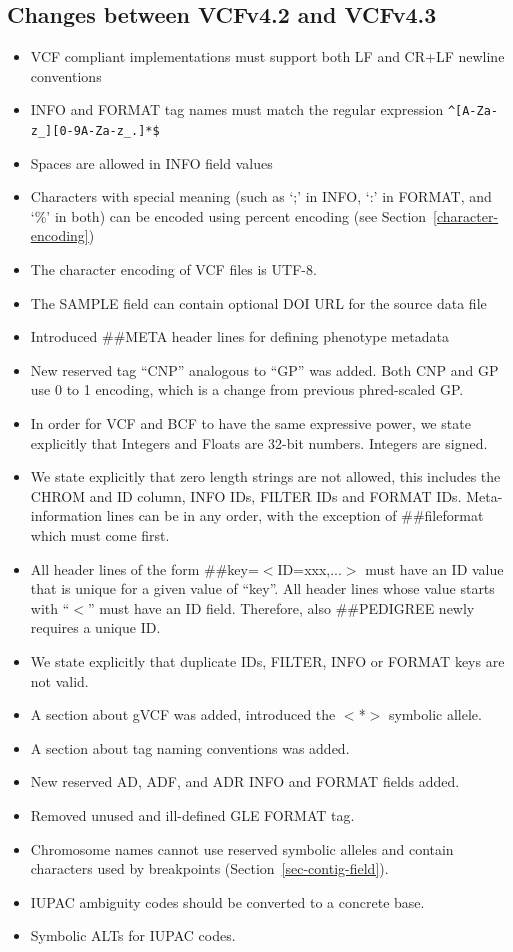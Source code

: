 \documentclass[8pt]{article}
\begin{document}
\subsection{Changes between VCFv4.2 and VCFv4.3}

\begin{itemize}
\item VCF compliant implementations must support both LF and CR+LF newline conventions
\item INFO and FORMAT tag names must match the regular expression \texttt{\^{}[A-Za-z\_][0-9A-Za-z\_.]*\$}
\item Spaces are allowed in INFO field values
\item Characters with special meaning (such as `;' in INFO, `:' in FORMAT, and `\%' in both) can be encoded using percent encoding (see Section~\ref{character-encoding})
\item The character encoding of VCF files is UTF-8.
\item The SAMPLE field can contain optional DOI URL for the source data file
\item Introduced \#\#META header lines for defining phenotype metadata
\item New reserved tag ``CNP'' analogous to ``GP'' was added. Both CNP and GP use 0 to 1 encoding, which is a change from previous phred-scaled GP.
\item In order for VCF and BCF to have the same expressive power, we state explicitly that Integers and Floats are 32-bit numbers.
Integers are signed.
\item We state explicitly that zero length strings are not allowed, this includes the CHROM and ID column, INFO IDs, FILTER IDs and FORMAT IDs.
Meta-information lines can be in any order, with the exception of \#\#fileformat which must come first.
\item All header  lines of the form \#\#key=$<$ID=xxx,...$>$ must have an ID value that is unique for a given value of ``key''.
All header lines whose value starts with ``$<$'' must have an ID field.
Therefore, also \#\#PEDIGREE newly requires a unique ID.
\item We state explicitly that duplicate IDs, FILTER, INFO or FORMAT keys are not valid.
\item A section about gVCF was added, introduced the $<$*$>$ symbolic allele.
\item A section about tag naming conventions was added.
\item New reserved AD, ADF, and ADR INFO and FORMAT fields added.
\item Removed unused and ill-defined GLE FORMAT tag.
\item Chromosome names cannot use reserved symbolic alleles and contain characters used by breakpoints (Section~\ref{sec-contig-field}).
\item IUPAC ambiguity codes should be converted to a concrete base.
\item Symbolic ALTs for IUPAC codes.
\end{itemize}
\end{document}
